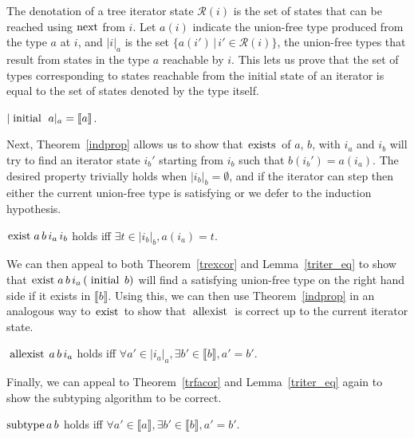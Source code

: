 \documentclass[a4paper,english]{lipics-v2019}
\newcommand{\denotes}[1]{\llbracket #1 \rrbracket}
\renewcommand{\c}[1]{\ensuremath{\text{\lstinline{#1}}}\xspace}
\begin{document}
\newcommand{\irdn}[1]{\ensuremath{\mathcal{R}({#1})}}
\newcommand{\irch}[2]{\ensuremath{|#1|_{#2}}}

\noindent
The denotation of a tree iterator state $\irdn{i}$ is the set of states that
can be reached using \c{next} from $i$. Let $a(i)$ indicate the union-free
type produced from the type $a$ at $i$, and \irch{i}{a} is the set
$\{a(i')\,|\,i'\in\irdn{i}\}$, the union-free types that result from states
in the type $a$ reachable by $i$.  This lets us prove that the set of types
corresponding to states reachable from the initial state of an iterator is
equal to the set of states denoted by the type itself.

\begin{lemma}\label{triter_eq}
$\irch{\c{initial}~a}{a} = \denotes{a}$.
\end{lemma}

\noindent
Next, Theorem~\ref{indprop} allows us to show that \c{exists} of $a$, $b$,
with $i_a$ and $i_b$ will try to find an iterator state $i_b'$ starting from
$i_b$ such that $b(i_b') = a(i_a)$. The desired property trivially holds
when $\irch{i_b}{b} = \emptyset$, and if the iterator can step then either
the current union-free type is satisfying or we defer to the induction
hypothesis.


\begin{theorem}\label{trexcor}
$\c{exist}\,a\,b\,i_a\,i_b$ holds iff $\exists t\in\irch{i_b}{b},a(i_a)= t$.
\end{theorem}

\noindent
We can then appeal to both Theorem~\ref{trexcor} and Lemma~\ref{triter_eq}
to show that $\c{exist}\,a\,b\,i_a\,(\c{initial}\,b)$ will find a satisfying
union-free type on the right hand side if it exists in $\denotes{b}$. Using
this, we can then use Theorem~\ref{indprop} in an analogous way to \c{exist}
to show that \c{allexist} is correct up to the current iterator state.

\begin{theorem}\label{trfacor}
$\c{allexist}\,a\,b\,i_a$ holds iff $\forall a'\in \irch{i_a}{a},
  \exists b'\in \denotes{b}, a'= b'$.
\end{theorem}

\noindent
Finally, we can appeal to Theorem~\ref{trfacor} and Lemma~\ref{triter_eq}
again to show the subtyping algorithm to be correct.

\begin{theorem}
$\c{subtype}\,a\,b$ holds iff $\forall a' \in \denotes{a}, \exists b' \in
  \denotes{b}, a' = b'$.
\end{theorem}
\end{document}
